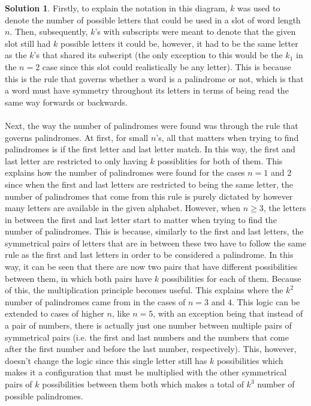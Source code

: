 \documentclass{article}
\theoremstyle{definition}
\newtheorem*{solution}{Solution}
\begin{document}
\begin{solution}
Firstly, to explain the notation in this diagram, $k$ was used to denote the number of possible letters that could be used in a slot of word length $n$. Then, subsequently, $k$'s with subscripts were meant to denote that the given slot still had $k$ possible letters it could be, however, it had to be the same letter as the $k$'s that shared its subscript (the only exception to this would be the $k_1$ in the $n=2$ case since this slot could realistically be any letter). This is because this is the rule that governs whether a word is a palindrome or not, which is that a word must have symmetry throughout its letters in terms of being read the same way forwards or backwards.\\\\
Next, the way the number of palindromes were found was through the rule that governs palindromes. At first, for small $n$'s, all that matters when trying to find palindromes is if the first letter and last letter match. In this way, the first and last letter are restricted to only having $k$ possiblities for both of them. This explains how the number of palindromes were found for the cases $n = 1$ and $2$ since when the first and last letters are restricted to being the same letter, the number of palindromes that come from this rule is purely dictated by however many letters are available in the given alphabet. However, when $n \geqslant 3$, the letters in between the first and last letter start to matter when trying to find the number of palindromes. This is because, similarly to the first and last letters, the symmetrical pairs of letters that are in between these two have to follow the same rule as the first and last letters in order to be considered a palindrome. In this way, it can be seen that there are now two pairs that have different possibilities between them, in which both pairs have $k$ possibilities for each of them. Because of this, the multiplication principle becomes useful. This explains where the $k^2$ number of palindromes came from in the cases of $n = 3$ and $4$. This logic can be extended to cases of higher $n$, like $n = 5$, with an exception being that instead of a pair of numbers, there is actually just one number between multiple pairs of symmetrical pairs (i.e. the first and last numbers and the numbers that come after the first number and before the last number, respectively). This, however, doesn't change the logic since this single letter still has $k$ possibilities which makes it a configuration that must be multiplied with the other symmetrical pairs of $k$ possibilities between them both which makes a total of $k^3$ number of possible palindromes.

\end{solution}
\end{document}
